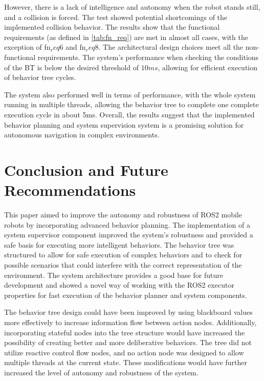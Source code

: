 \documentclass[letterpaper, 10pt, conference]{ieeeconf}
\begin{document}
However, there is a lack of intelligence and autonomy when the robot stands still, and a collision is forced. The test showed potential shortcomings of the implemented collision behavior. The results show that the functional requirements (as defined in \ref{tab:fn_req}) are met in almost all cases, with the exception of fn$_req6$ and fn$_req8$. The architectural design choices meet all the non-functional requirements. The system's performance when checking the conditions of the BT is below the desired threshold of $10ms$, allowing for efficient execution of behavior tree cycles. 

The system also performed well in terms of performance, with the whole system running in multiple threads, allowing the behavior tree to complete one complete execution cycle in about 5ms. Overall, the results suggest that the implemented behavior planning and system supervision system is a promising solution for autonomous navigation in complex environments.


\section{Conclusion and Future Recommendations}
\label{sec:Conclusion}

This paper aimed to improve the autonomy and robustness of ROS2 mobile robots by incorporating advanced behavior planning. The implementation of a system supervisor component improved the system's robustness and provided a safe basis for executing more intelligent behaviors. The behavior tree was structured to allow for safe execution of complex behaviors and to check for possible scenarios that could interfere with the correct representation of the environment. The system architecture provides a good base for future development and showed a novel way of working with the ROS2 executor properties for fast execution of the behavior planner and system components.

The behavior tree design could have been improved by using blackboard values more effectively to increase information flow between action nodes. Additionally, incorporating stateful nodes into the tree structure would have increased the possibility of creating better and more deliberative behaviors. The tree did not utilize reactive control flow nodes, and no action node was designed to allow multiple threads at the current state. These modifications would have further increased the level of autonomy and robustness of the system.
\end{document}
